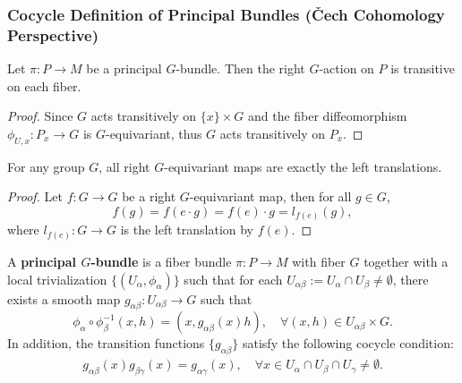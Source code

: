 \subsubsection*{Cocycle Definition of Principal Bundles (\v{C}ech Cohomology Perspective)}
\begin{proposition}
    Let $\pi: P\to M$ be a principal $G$-bundle. 
    Then the right $G$-action on $P$ is transitive on each fiber.
\end{proposition}
\begin{proof}
    Since $G$ acts transitively on $\{x\}\times G$ and the fiber diffeomorphism $\phi_{U,x}:P_x\to G$ 
    is $G$-equivariant, thus $G$ acts transitively on $P_x$.
\end{proof} 
\begin{lemma}\label{lem:equivariant-maps-are-left-translations}
    For any group $G$, all right $G$-equivariant maps are exactly the left translations. 
\end{lemma}
\begin{proof}
    Let $f: G\to G$ be a right $G$-equivariant map, then for all $g\in G$, 
    \begin{equation*}
        f(g) = f(e\cdot g) = f(e)\cdot g = l_{f(e)}(g),
    \end{equation*}
    where $l_{f(e)}: G\to G$ is the left translation by $f(e)$.
\end{proof}
\begin{definition}
    A \textbf{principal $G$-bundle} is a fiber bundle $\pi: P\to M$ with fiber $G$ 
    together with a local trivialization $\{(U_\alpha, \phi_\alpha)\}$ 
    such that for each $U_{\alpha\beta}:=U_\alpha\cap U_\beta\neq\emptyset$, 
    there exists a smooth map $g_{\alpha\beta}: U_{\alpha\beta}\to G$ such that 
    \begin{equation*}
        \phi_\alpha\circ\phi_\beta^{-1}(x,h) = (x, g_{\alpha\beta}(x)h), 
        \quad \forall (x,h)\in U_{\alpha\beta}\times G.
    \end{equation*}
    In addition, the transition functions $\{g_{\alpha\beta}\}$ satisfy the following cocycle condition: 
    \begin{gather*}
        g_{\alpha\beta}(x)g_{\beta\gamma}(x) = g_{\alpha\gamma}(x), 
        \quad \forall x\in U_\alpha\cap U_\beta\cap U_\gamma\neq\emptyset.
    \end{gather*}
\end{definition}
